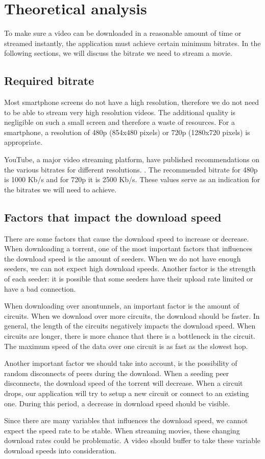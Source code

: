 \section{Theoretical analysis}
\label{sec:experiments:theoretical}
	To make sure a video can be downloaded in a reasonable amount of time or streamed instantly, the application must achieve certain minimum bitrates. In the following sections, we will discuss the bitrate we need to stream a movie.
	
	\subsection{Required bitrate}
	\label{sec:experiments:theoretical:bitrates}
		Most smartphone screens do not have a high resolution, therefore we do not need to be able to stream very high resolution videos. The additional quality is negligible on such a small screen and therefore a waste of resources. For a smartphone, a resolution of 480p (854x480 pixels) or 720p (1280x720 pixels) is appropriate.
		
		YouTube, a major video streaming platform, have published recommendations on the various bitrates for different resolutions. \cite{googlebitrates}. The recommended bitrate for 480p is 1000 Kb/s and for 720p it is 2500 Kb/s. These values serve as an indication for the bitrates we will need to achieve. 
		
	\subsection{Factors that impact the download speed}
		There are some factors that cause the download speed to increase or decrease. When downloading a torrent, one of the most important factors that influences the download speed is the amount of seeders. When we do not have enough seeders, we can not expect high download speeds. Another factor is the strength of each seeder: it is possible that some seeders have their upload rate limited or have a bad connection.
		
		When downloading over anontunnels, an important factor is the amount of circuits. When we download over more circuits, the download should be faster. In general, the length of the circuits negatively impacts the download speed. When circuits are longer, there is more chance that there is a bottleneck in the circuit. The maximum speed of the data over one circuit is as fast as the slowest hop.
		
		Another important factor we should take into account, is the possibility of random disconnects of peers during the download. When a seeding peer disconnects, the download speed of the torrent will decrease. When a circuit drops, our application will try to setup a new circuit or connect to an existing one. During this period, a decrease in download speed should be visible.
		
		Since there are many variables that influences the download speed, we cannot expect the speed rate to be stable. When streaming movies, these changing download rates could be problematic. A video should buffer to take these variable download speeds into consideration.